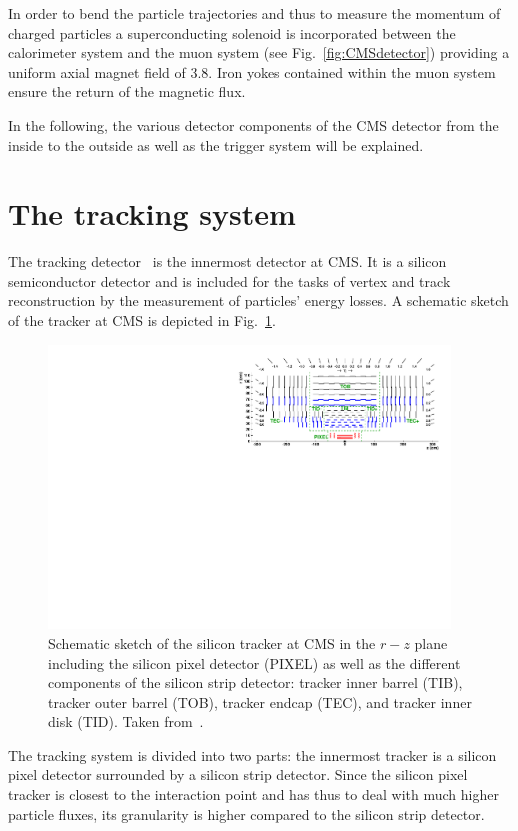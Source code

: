 In order to bend the particle trajectories and thus to measure the momentum of charged particles a superconducting solenoid is incorporated between the calorimeter system and the muon system (see Fig.~\ref{fig:CMSdetector}) providing a uniform axial magnet field of 3.8\tesla.
Iron yokes contained within the muon system ensure the return of the magnetic flux. 

In the following, the various detector components of the CMS detector from the inside to the outside as well as the trigger system will be explained.
\FloatBarrier
\section{The tracking system}
\label{sec:TrackingSystem}
The tracking detector~\cite{bib:CMS:TDR_2006,bib:CMS:Tracker_1997,bib:CMS:Tracker_2000} is the innermost detector at CMS. 
It is a silicon semiconductor detector and is included for the tasks of vertex and track reconstruction by the measurement of particles' energy losses.
A schematic sketch of the tracker at CMS is depicted in Fig.~\ref{fig:Tracker}.
\begin{figure}[!b]
  \centering
      \includegraphics[width=0.95\textwidth]{figures/experiment/CMS/TrackerLayoutNew.pdf}
  \caption{Schematic sketch of the silicon tracker at CMS in the $r - z$ plane including the silicon pixel detector (PIXEL) as well as the different components of the silicon strip detector: tracker inner barrel (TIB), tracker outer barrel (TOB), tracker endcap (TEC), and tracker inner disk (TID). Taken from~\cite{bib:CMS:tracking_8TeV}.
           }  
  \label{fig:Tracker}
\end{figure}
The tracking system is divided into two parts: the innermost tracker is a silicon pixel detector surrounded by a silicon strip detector.
Since the silicon pixel tracker is closest to the interaction point and has thus to deal with much higher particle fluxes, its granularity is higher compared to the silicon strip detector.

